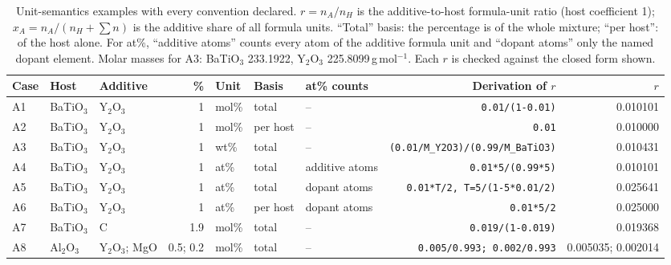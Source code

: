 \begin{table}[!t]
\centering
\caption{Unit-semantics examples with every convention declared. $r=n_A/n_H$ is the additive-to-host formula-unit ratio (host coefficient 1); $x_A=n_A/(n_H+\sum n)$ is the additive share of all formula units. ``Total'' basis: the percentage is of the whole mixture; ``per host'': of the host alone. For at\%, ``additive atoms'' counts every atom of the additive formula unit and ``dopant atoms'' only the named dopant element. Molar masses for A3: BaTiO$_3$ 233.1922, Y$_2$O$_3$ 225.8099\,g\,mol$^{-1}$. Each $r$ is checked against the closed form shown.}
\label{tab:semantic_unit_eval}
\footnotesize
\setlength{\tabcolsep}{4pt}
\begin{tabular}{@{}lllrlllrr@{}}
\toprule
Case & Host & Additive & \% & Unit & Basis & at\% counts & Derivation of $r$ & $r$ \\
\midrule
A1 & BaTiO$_{3}$ & Y$_{2}$O$_{3}$ & 1 & mol\% & total & -- & \texttt{0.01/(1-0.01)} & 0.010101 \\
A2 & BaTiO$_{3}$ & Y$_{2}$O$_{3}$ & 1 & mol\% & per host & -- & \texttt{0.01} & 0.010000 \\
A3 & BaTiO$_{3}$ & Y$_{2}$O$_{3}$ & 1 & wt\% & total & -- & \texttt{(0.01/M\_Y2O3)/(0.99/M\_BaTiO3)} & 0.010431 \\
A4 & BaTiO$_{3}$ & Y$_{2}$O$_{3}$ & 1 & at\% & total & additive atoms & \texttt{0.01*5/(0.99*5)} & 0.010101 \\
A5 & BaTiO$_{3}$ & Y$_{2}$O$_{3}$ & 1 & at\% & total & dopant atoms & \texttt{0.01*T/2, T=5/(1-5*0.01/2)} & 0.025641 \\
A6 & BaTiO$_{3}$ & Y$_{2}$O$_{3}$ & 1 & at\% & per host & dopant atoms & \texttt{0.01*5/2} & 0.025000 \\
A7 & BaTiO$_{3}$ & C & 1.9 & mol\% & total & -- & \texttt{0.019/(1-0.019)} & 0.019368 \\
A8 & Al$_{2}$O$_{3}$ & Y$_{2}$O$_{3}$; MgO & 0.5; 0.2 & mol\% & total & -- & \texttt{0.005/0.993; 0.002/0.993} & 0.005035; 0.002014 \\
\bottomrule
\end{tabular}
\end{table}
